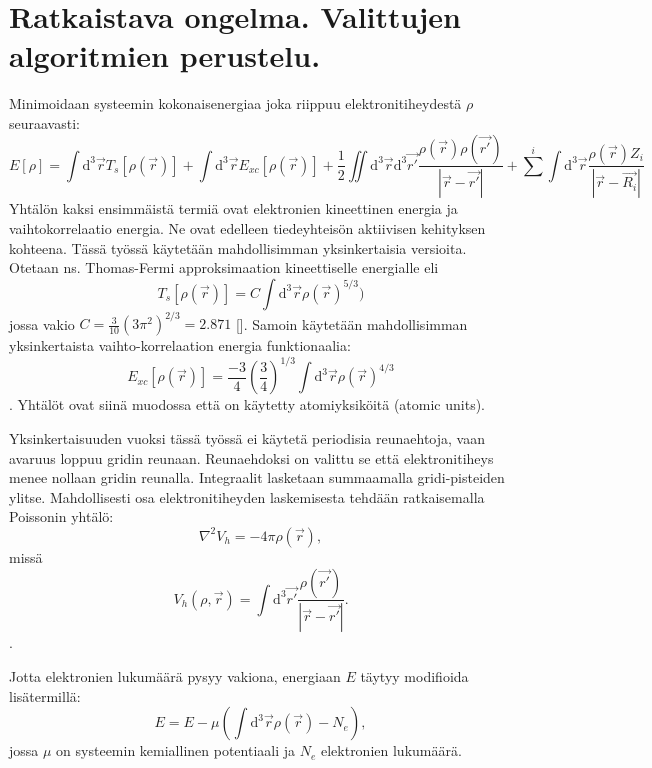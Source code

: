 \documentclass{article}
\begin{document}
\section{Ratkaistava ongelma. Valittujen algoritmien perustelu.}
Minimoidaan systeemin kokonaisenergiaa joka riippuu elektronitiheydestä $\rho$ seuraavasti:
\begin{equation}
E[\rho] = 
\int \mathrm{d}^3\vec{r} T_s[\rho(\vec{r})] + 
\int \mathrm{d}^3\vec{r} E_{xc}[\rho(\vec{r})] + 
\frac{1}{2} \iint \mathrm{d}^3\vec{r}\mathrm{d}^3\vec{r'}
\frac{\rho(\vec{r}) \rho(\vec{r'})}{|\vec{r}-\vec{r'}|} +
\sum^i \int \mathrm{d}^3\vec{r} 
\frac{\rho(\vec{r}) Z_i }{|\vec{r}-\vec{R_i}|} 
\end{equation}
Yhtälön kaksi ensimmäistä termiä ovat elektronien kineettinen energia
ja vaihtokorrelaatio energia. Ne ovat edelleen tiedeyhteisön
aktiivisen kehityksen kohteena. Tässä työssä käytetään mahdollisimman
yksinkertaisia versioita. Otetaan ns. Thomas-Fermi approksimaation
kineettiselle energialle eli
\begin{equation}
T_s[\rho(\vec{r})] = C \int \mathrm{d}^3\vec{r} \rho(\vec{r})^{5/3})
\end{equation}
jossa vakio $C=\frac{3}{10}(3\pi^2)^{2/3} = 2.871$
[\cite{march1957thomas}].  Samoin käytetään mahdollisimman
yksinkertaista vaihto-korrelaation energia funktionaalia:
\begin{equation}
E_{xc}[\rho(\vec{r})] = \frac{-3}{4}(\frac{3}{4})^{1/3}\int
\mathrm{d}^3\vec{r} \rho(\vec{r})^{4/3}
\end{equation}.
Yhtälöt ovat siinä muodossa että on käytetty atomiyksiköitä (atomic
units).

Yksinkertaisuuden vuoksi tässä työssä ei käytetä periodisia
reunaehtoja, vaan avaruus loppuu gridin reunaan. Reunaehdoksi on
valittu se että elektronitiheys menee nollaan gridin
reunalla. Integraalit lasketaan summaamalla gridi-pisteiden
ylitse. Mahdollisesti osa elektronitiheyden laskemisesta tehdään
ratkaisemalla Poissonin yhtälö:
\begin{equation}
\label{poisson}
\nabla^2 V_h = -4 \pi \rho(\vec{r}),
\end{equation}
missä
\begin{equation}
\label{hartree}
V_h (\rho, \vec{r}) = \int \mathrm{d}^3\vec{r'} 
\frac{\rho(\vec{r'}) }{|\vec{r}-\vec{r'}|}.
\end{equation}.

Jotta elektronien lukumäärä pysyy vakiona, energiaan $E$ täytyy
modifioida lisätermillä:
\begin{equation}
E=E-\mu (\int \mathrm{d}^3\vec{r}\rho(\vec{r})-N_e),
\end{equation}
jossa $\mu$ on systeemin kemiallinen potentiaali ja 
$N_e$ elektronien lukumäärä.
\end{document}
